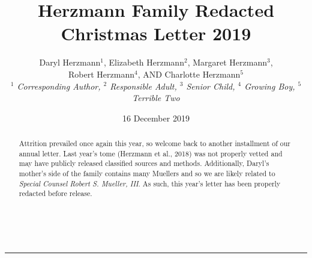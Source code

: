 \documentclass[letterpaper,11pt]{article}
\title{\vspace{-2.0cm}Herzmann Family Redacted Christmas Letter 2019}
\author{Daryl Herzmann${}^1$, Elizabeth Herzmann${}^2$, Margaret 
Herzmann${}^3$,\\
Robert Herzmann${}^4$, AND Charlotte Herzmann${}^5$ \\
\it{${}^1$ Corresponding Author},
\it{${}^2$ Responsible Adult},
\it{${}^3$ Senior Child},
\it{${}^4$ Growing Boy},
\it{${}^5$ Terrible Two}}
\date{16 December 2019}
\newcommand{\Line}[0]{%
  \rule{0cm}{0cm}\\\hrule\rule{0cm}{0cm}%
}
\begin{document}
\maketitle
\vspace{-0.75cm}
\begin{abstract}
Attrition prevailed once again this year, so welcome back to another installment
of our annual letter.  Last year's tome (Herzmann et al., 2018) was not properly
vetted and may have publicly released classified sources and methods.
Additionally, Daryl's mother's side of the family contains many Muellers 
and so we are likely related to \textit{Special Counsel Robert S. Mueller, III}.  
As such, this year's letter has been properly redacted before release.
\end{abstract}

\vspace{-0.5cm}
\Line
\end{document}
